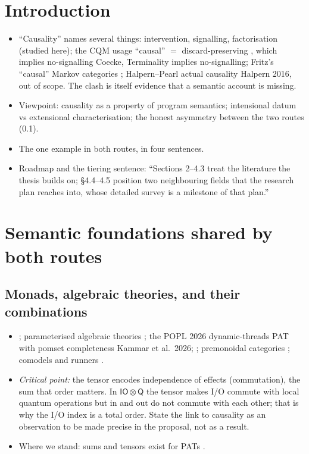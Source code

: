 \documentclass[11pt,a4paper]{article}
\newif\ifskeletonnotes
\newcommand{\sknote}[1]{\ifskeletonnotes{\small\color{blue!60!black}\textit{[#1]}}\fi}
\newcommand{\budget}[1]{\ifskeletonnotes{\small\color{red!60!black}\textbf{(\textasciitilde#1 words)}}\fi}
\newcommand{\sknew}[1]{\ifskeletonnotes{\color{purple!70!black}[NEW: #1]}\else#1\fi}
\newcommand{\iotq}{\mathsf{IO}\otimes\mathsf{Q}}   %
\begin{document}
\section{Introduction}\budget{300}
\begin{itemize}[nosep]
\item ``Causality'' names several things: intervention, signalling, factorisation (studied here); the CQM usage ``causal'' $=$ discard-preserving \cite{PQP_Coecke_Kissinger_2017,kissinger2019categorical}, which implies no-signalling \sknew{Coecke, Terminality implies no-signalling}; Fritz's ``causal'' Markov categories \cite{fritz2020synthetic} \sknote{check definition number}; Halpern--Pearl actual causality \sknew{Halpern 2016}, out of scope. The clash is itself evidence that a semantic account is missing.
\item Viewpoint: causality as a property of program semantics; intensional datum vs extensional characterisation; the honest asymmetry between the two routes (0.1).
\item The one example in both routes, in four sentences.
\item Roadmap and the tiering sentence: ``Sections 2--4.3 treat the literature the thesis builds on; \S4.4--4.5 position two neighbouring fields that the research plan reaches into, whose detailed survey is a milestone of that plan.''
\end{itemize}

\section{Semantic foundations shared by both routes}\budget{800}
\subsection{Monads, algebraic theories, and their combinations}\budget{300}
\begin{itemize}[nosep]
\item \cite{MOGGI199155,moggi1991monadicmetalanguage,plotkin_power_2002,PlotkinPower04CompEffectsOverview,lawveretheories_monads_HYLAND2007437,sums_tensors_HYLAND200670,bauer2019algebraicalgebraiceffectshandlers}; parameterised algebraic theories \cite{statonlics13,statonpopl15}; the POPL 2026 dynamic-threads PAT with pomset completeness \sknew{Kammar et al.\ 2026}; \cite{stark:freamp}; premonoidal categories \cite{premonoidal_cat_POWER_ROBINSON_1997,PowerRobinson97premonoidal}; comodels and runners \cite{model_comodel_PLOTKIN2008295,runners_10.1007/978-3-030-44914-8_2}.
\item \emph{Critical point:} the tensor encodes independence of effects (commutation), the sum that order matters. In $\iotq$ the tensor makes I/O commute with local quantum operations but $\mathrm{in}$ and $\mathrm{out}$ do not commute with each other; that is why the I/O index is a total order. State the link to causality as an observation to be made precise in the proposal, not as a result.
\item Where we stand: sums and tensors exist for PATs \cite{wang_algebraic_2024}.
\end{itemize}
\end{document}

